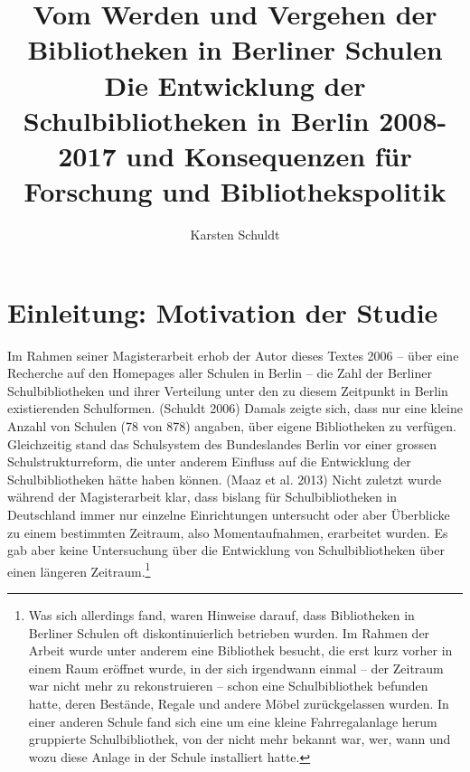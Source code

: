 \documentclass[a4paper,
fontsize=11pt,
oneside,
numbers=noperiodatend,
parskip=half-,
bibliography=totoc,
final
]{scrartcl}
\title{\LARGE{Vom Werden und Vergehen der Bibliotheken in Berliner Schulen\\}Die Entwicklung der Schulbibliotheken in Berlin 2008-2017 und
    Konsequenzen für Forschung und Bibliothekspolitik} %
\author{Karsten Schuldt} %
\date{}
\begin{document}
\maketitle
\thispagestyle{fancyplain} 


\section{Einleitung: Motivation der
Studie}\label{einleitung-motivation-der-studie}

Im Rahmen seiner Magisterarbeit erhob der Autor dieses Textes 2006 --
über eine Recherche auf den Homepages aller Schulen in Berlin -- die
Zahl der Berliner Schulbibliotheken und ihrer Verteilung unter den zu
diesem Zeitpunkt in Berlin existierenden Schulformen. (Schuldt 2006)
Damals zeigte sich, dass nur eine kleine Anzahl von Schulen (78 von 878)
angaben, über eigene Bibliotheken zu verfügen. Gleichzeitig stand das
Schulsystem des Bundeslandes Berlin vor einer grossen
Schulstrukturreform, die unter anderem Einfluss auf die Entwicklung der
Schulbibliotheken hätte haben können. (Maaz et al. 2013) Nicht zuletzt
wurde während der Magisterarbeit klar, dass bislang für
Schulbibliotheken in Deutschland immer nur einzelne Einrichtungen
untersucht oder aber Überblicke zu einem bestimmten Zeitraum, also
Momentaufnahmen, erarbeitet wurden. Es gab aber keine Untersuchung über
die Entwicklung von Schulbibliotheken über einen längeren
Zeitraum.\footnote{Was sich allerdings fand, waren Hinweise darauf, dass
  Bibliotheken in Berliner Schulen oft diskontinuierlich betrieben
  wurden. Im Rahmen der Arbeit wurde unter anderem eine Bibliothek
  besucht, die erst kurz vorher in einem Raum eröffnet wurde, in der
  sich irgendwann einmal -- der Zeitraum war nicht mehr zu
  rekonstruieren -- schon eine Schulbibliothek befunden hatte, deren
  Bestände, Regale und andere Möbel zurückgelassen wurden. In einer
  anderen Schule fand sich eine um eine kleine Fahrregalanlage herum
  gruppierte Schulbibliothek, von der nicht mehr bekannt war, wer, wann
  und wozu diese Anlage in der Schule installiert hatte.}
\end{document}
